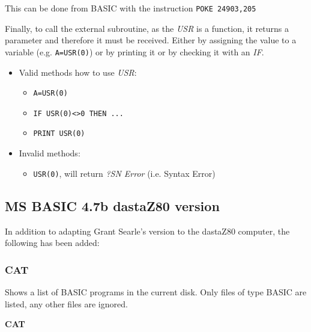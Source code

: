         This can be done from BASIC with the instruction \texttt{POKE 24903,205}

        Finally, to call the external subroutine, as the \textit{USR} is a function,
        it returns a parameter and therefore it must be received. Either by assigning
        the value to a variable (e.g. \texttt{A=USR(0)}) or by printing it or by
        checking it with an \textit{IF}.

        \begin{itemize}
            \item Valid methods how to use \textit{USR}:
            \begin{itemize}
                \item \texttt{A=USR(0)}
                \item \texttt{IF USR(0)<>0 THEN ...}
                \item \texttt{PRINT USR(0)}
            \end{itemize}
            \item Invalid methods:
            \begin{itemize}
                \item \texttt{USR(0)}, will return \textit{?SN Error} (i.e. Syntax Error)
            \end{itemize}
        \end{itemize}

    \subsection{MS BASIC 4.7b dastaZ80 version}

    In addition to adapting Grant Searle's version to the dastaZ80 computer,
    the following has been added:

        \subsubsection{{CAT}}
        Shows a list of BASIC programs in the current disk. Only files of type
        BASIC are listed, any other files are ignored.

        \hspace{1.9cm}\textbf{CAT}

